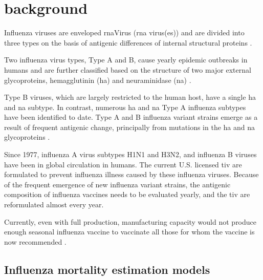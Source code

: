 

\makeglossaries





\tableofcontents
\printglossary[type=bus]
\printglossary[type=dm]
\printglossary[type=\acronymtype]


\section{background}

Influenza viruses are enveloped \gls{rnaVirus} (\acrshort{rna} virus(es)) and
are divided into three types on the basis of \gls{antigen}ic differences of internal
structural proteins \citep{fdaGuidanceIndustryClinical2007}.

Two influenza virus types, Type A and B, cause yearly epidemic outbreaks in humans
and are further classified based on the structure of two major external
\gls{glycoprotein}s, hemagglutinin (\acrshort{ha}) and neuraminidase (\acrshort{na})
\citep{fdaGuidanceIndustryClinical2007}.

Type B viruses, which are largely restricted to the human host, have a single
\acrshort{ha} and \acrshort{na} subtype.  In contrast, numerous \acrshort{ha}
and \acrshort{na} Type A influenza subtypes have been identified to date.  Type
A and B influenza variant strains emerge as a result of frequent
\gls{antigen}ic change, principally from \gls{mutation}s in the \acrshort{ha}
and \acrshort{na} \gls{glycoprotein}s \citep{fdaGuidanceIndustryClinical2007}.

Since 1977, influenza A virus subtypes H1N1 and H3N2, and influenza B viruses
have been in global circulation in humans. The current U.S. licensed
\gls{tiv} are formulated to prevent influenza illness
caused by these influenza viruses.  Because of the frequent emergence of new
influenza variant strains, the \gls{antigen}ic composition of influenza vaccines
needs to be evaluated yearly, and the \gls{tiv} are reformulated almost every
year.

Currently, even with full production, manufacturing capacity would not produce
enough seasonal influenza vaccine to vaccinate all those for whom the vaccine
is now recommended \citep{fdaGuidanceIndustryClinical2007}.

\subsection{Influenza mortality estimation models}

